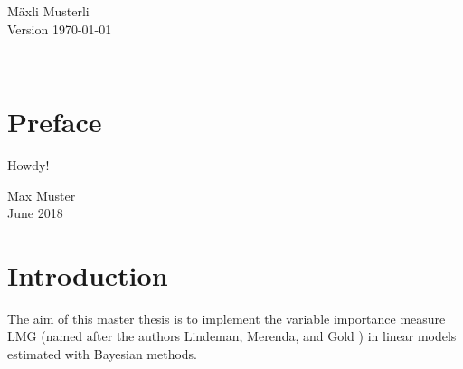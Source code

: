 \documentclass[11pt,a4paper,twoside]{book}\usepackage[]{graphicx}\usepackage[]{color}
\begin{document}


\graphicspath{{./figure/}}
\setcounter{tocdepth}{1}

\thispagestyle{empty}
\begin{center}
\vspace*{6cm}{\bfseries\Huge
  $p$-values:\\[5mm] their use, abuse and proper use \\[5mm]
  illustrated with seven facets 
}
\vfill
\rm

\LARGE
M\"axli Musterli\\[12mm]

\normalsize
Version \today
\end{center}
\newpage
\thispagestyle{empty}~
\newpage
{}

\thispagestyle{plain}
\tableofcontents
{}

\chapter*{Preface}
\thispagestyle{plain}

Howdy!

\bigskip

\begin{flushright}
Max Muster\\
June 2018
\end{flushright}


\cleardoublepage
{}












\chapter{Introduction}

The aim of this master thesis is to implement the variable importance measure LMG  (named after the authors Lindeman, Merenda, and Gold \citep{Gromping2007}) in linear models estimated with Bayesian methods. 
\end{document}
